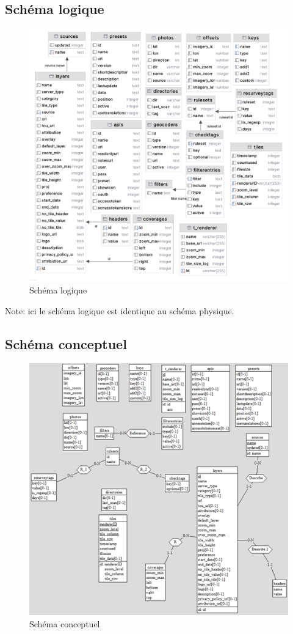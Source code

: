 \subsection{Schéma logique}
\begin{figure}[H]
    \centering
    \includegraphics[scale=1]{images/schema_physique.png}
    \caption{Schéma logique}
    \label{fig:schéma_logique}
\end{figure}
Note: ici le schéma logique est identique au schéma physique.

\subsection{Schéma conceptuel}
\begin{figure}[H]
    \centering
    \includegraphics[scale=1]{images/schema_conceptuel.png}
    \caption{Schéma conceptuel}
    \label{fig:schéma_conceptuel}
\end{figure}